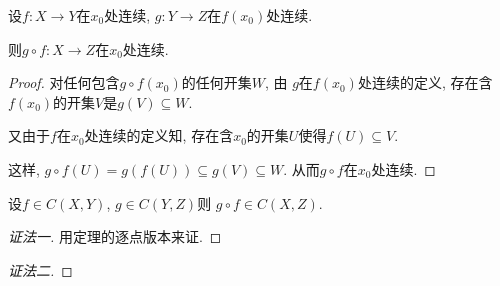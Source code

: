\begin{theorem}[连续映射的复合是连续的]
    设$f \colon X \to Y$在$x_0$处连续, $g \colon Y \to Z$在$f\left( x_0 \right) $处连续.
    
    则$g \circ f \colon X \to Z$在$x_0$处连续.
\end{theorem}
\begin{proof}
    对任何包含$g \circ f\left( x_0 \right) $的任何开集$W$, 由 $g$在$f\left( x_0 \right) $处连续的定义, 存在含$f\left( x_0 \right) $的开集$V$是$g\left( V  \right) \subseteq W$.

    又由于$f$在$x_0$处连续的定义知, 存在含$x_0$的开集$U$使得$f\left( U \right) \subseteq V$.

    这样, $g \circ f \left( U \right) = g\left( f\left( U \right)  \right) \subseteq g\left( V \right) \subseteq W$. 从而$g \circ f$在$x_0$处连续.
\end{proof}

\begin{theorem}[映射复合保持连续性]
    设$f \in C\left( X,Y \right) $, $g \in C\left( Y,Z \right) $则 $g \circ f \in C\left( X, Z \right) $.
\end{theorem}
\begin{proof}[证法一]
    用定理的逐点版本来证.
\end{proof}
\begin{proof}[证法二]
\end{proof}

